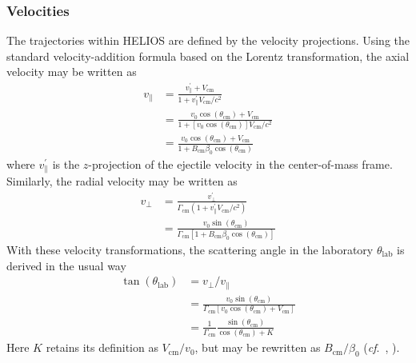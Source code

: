 \subsubsection{Velocities}
The trajectories within HELIOS are defined by the velocity projections.  Using the standard ve\-loc\-i\-ty-ad\-di\-tion formula based on the Lorentz transformation, the axial velocity may be written as
\begin{equation}
\begin{split}
v_\parallel&=\frac{v_\parallel^\prime+V_\mathrm{cm}}{1+v_\parallel^\prime V_\mathrm{cm}/c^2}\\
&=\frac{v_0\cos(\theta_\mathrm{cm}) + V_\mathrm{cm}}{1+[v_0\cos(\theta_\mathrm{cm})]V_\mathrm{cm}/c^2}\\
&=\frac{v_0\cos(\theta_\mathrm{cm}) + V_\mathrm{cm}}{1+B_\mathrm{cm}\beta_{0}\cos(\theta_\mathrm{cm})}
\end{split}
\label{eq:rel_v_x}
\end{equation}
where $v_\parallel^\prime$ is the $z$-projection of the ejectile velocity in the center-of-mass frame.  Similarly, the radial velocity may be written as
\begin{equation}
\begin{split}
v_\perp&=\frac{v_\perp^\prime}{\Gamma_\mathrm{cm}(1+v_\parallel^\prime V_\mathrm{cm}/c^2)}\\
&=\frac{v_0 \sin(\theta_\mathrm{cm})}{\Gamma_\mathrm{cm}[1+B_\mathrm{cm}\beta_{0}\cos(\theta_\mathrm{cm})]}
\end{split}
\label{eq:rel_v_y}
\end{equation}
With these velocity transformations, the scattering angle in the laboratory $\theta_\mathrm{lab}$ is derived in the usual way
\begin{equation}
\begin{split}
\tan(\theta_\mathrm{lab})&=v_\perp/v_\parallel\\
&=\frac{v_0\sin(\theta_\mathrm{cm})}{\Gamma_\mathrm{cm}[v_0\cos(\theta_\mathrm{cm}) + V_\mathrm{cm}]}\\
&=\frac{1}{\Gamma_\mathrm{cm}}\frac{\sin(\theta_\mathrm{cm})}{\cos(\theta_\mathrm{cm})+K}
\end{split}
\label{eq:new_angle}
\end{equation}
Here $K$ retains its definition as $V_\mathrm{cm}/v_0$, but may be rewritten as $B_\mathrm{cm}/\beta_0$ (\textit{cf}.~\citet[Eq.~7.112]{Goldstein_2002}, \citet[Eq.~3.2]{Michalowicz_1967}).
